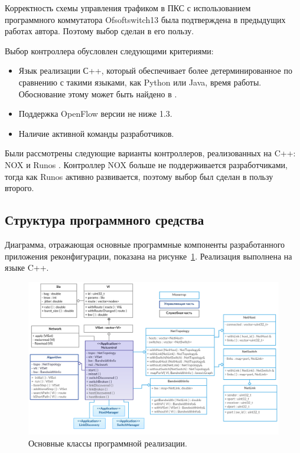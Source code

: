 \documentclass[12pt, a4paper]{article}
\begin{document}
Корректность схемы управления трафиком в ПКС с использованием программного коммутатора Ofsoftswitch13 \cite{ofsoftswitch} была подтверждена в предыдущих работах автора. Поэтому выбор сделан в его пользу.

Выбор контроллера обусловлен следующими критериями:
\begin{itemize}
	\item Язык реализации С++, который обеспечивает более детерминированное по сравнению с такими языками, как Python или Java, время работы. Обоснование этому может быть найдено в \cite{cpp}.
	\item Поддержка OpenFlow версии не ниже 1.3.
	\item Наличие активной команды разработчиков.
\end{itemize}

Были рассмотрены следующие варианты контроллеров, реализованных на C++: NOX \cite{nox} и Runos \cite{runos}. Контроллер NOX больше не поддерживается разработчиками, тогда как Runos активно развивается, поэтому выбор был сделан в пользу второго.

\subsection{Структура программного средства}
Диаграмма, отражающая основные программные компоненты разработанного приложения реконфигурации, показана на рисунке~\ref{pic:classes}. Реализация выполнена на языке C++.

\begin{figure}[h!]
	\centering
	\includegraphics[width=1.0\textwidth]{img/classes.png}
	\caption{Основные классы программной реализации.}
	\label{pic:classes}
\end{figure}
\end{document}
